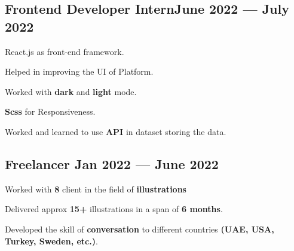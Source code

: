 \subsection{{Frontend Developer Intern\hfill June 2022 --- July 2022}}
\begin{zitemize}
\item React.js as front-end framework.
\item Helped in improving the UI of Platform.
\item Worked with \textbf{dark} and \textbf{light} mode.
\item \textbf{Scss} for Responsiveness.
\item Worked and learned to use \textbf{API} in dataset storing the data.
\end{zitemize}

\subsection{{Freelancer \hfill Jan 2022 --- June 2022}}
\begin{zitemize}
\item Worked with \textbf{8} client in the field of \textbf{illustrations}
\item Delivered approx \textbf{15+} illustrations in a span of \textbf{6 months}.
\item Developed the skill of  \textbf{conversation} to different countries \textbf{(UAE, USA, Turkey, Sweden, etc.)}.
\end{zitemize}